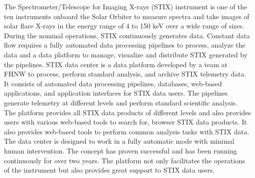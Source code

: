 \documentclass[referee]{aa} %
\begin{document}
  \abstract
   {The Spectrometer/Telescope for Imaging X-rays (STIX) instrument is one 
   of the ten instruments onboard the Solar Orbiter to measure spectra and take images of solar flare X-rays in the energy range of 4 to 150 keV over a wide range of sizes.} %
   {During the nominal operations, STIX continuously generates data. Constant data flow requires a fully automated data processing pipelines to process,
     analyze the data and a data platform to manage, 
   visualize and distribute STIX generated by the pipelines.   
   }
   {
    STIX data center is a data platform developed by a team at FHNW to process, perform standard analysis, and archive STIX telemetry data. 
   It consists of automated data processing pipelines, databases, 
   web-based applications, and application interfaces for STIX data users.  
   The pipelines generate telemetry at different levels and perform standard scientific analysis. 
   }
   {
 The platform provides 
 all STIX data products of different levels and also provides users 
 with various web-based tools to search for,  browser STIX data products. 
 It also provides web-based tools to perform common analysis tasks with STIX data. 
  The data center is designed to work in a fully automatic mode with minimal human intervention. The concept has proven successful 
 and has been running continuously for over two years. The platform not only facilitates the operations of the instrument but also provides great support to STIX data users.}
\end{document}
